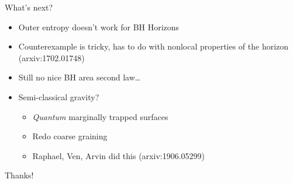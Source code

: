 \documentclass{beamer}
\begin{document}
  \begin{frame}{What's next?}
    \begin{itemize}[<+(1)->]
      \item Outer entropy doesn't work for BH Horizons
      \item Counterexample is tricky, has to do with nonlocal properties of the horizon (arxiv:1702.01748)
      \item Still no nice BH area second law\ldots
      \item Semi-classical gravity?
        \begin{itemize}
          \item \textit{Quantum} marginally trapped surfaces
          \item Redo coarse graining
          \item Raphael, Ven, Arvin did this (arxiv:1906.05299)
        \end{itemize}
    \end{itemize}
  \end{frame}

  \begin{frame}
    \begin{center}
      \Huge Thanks!
    \end{center}
  \end{frame}
\end{document}
